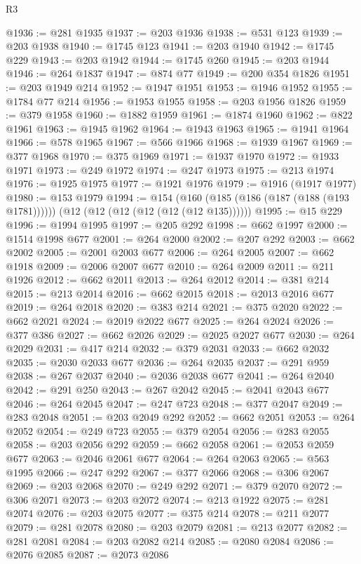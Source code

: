 \begin{lexlean}{R3}
\begin{coremodule}
@1936 := @281 @1935
@1937 := @203 @1936
@1938 := @531 @123
@1939 := @203 @1938
@1940 := @1745 @123
@1941 := @203 @1940
@1942 := @1745 @229
@1943 := @203 @1942
@1944 := @1745 @260
@1945 := @203 @1944
@1946 := @264 @1837
@1947 := @874 @77
@1949 := @200 @354 @1826
@1951 := @203 @1949 @214
@1952 := @1947 @1951
@1953 := @1946 @1952
@1955 := @1784 @77 @214
@1956 := @1953 @1955
@1958 := @203 @1956 @1826
@1959 := @379 @1958
@1960 := @1882 @1959
@1961 := @1874 @1960
@1962 := @822 @1961
@1963 := @1945 @1962
@1964 := @1943 @1963
@1965 := @1941 @1964
@1966 := @578 @1965
@1967 := @566 @1966
@1968 := @1939 @1967
@1969 := @377 @1968
@1970 := @375 @1969
@1971 := @1937 @1970
@1972 := @1933 @1971
@1973 := @249 @1972
@1974 := @247 @1973
@1975 := @213 @1974
@1976 := @1925 @1975
@1977 := @1921 @1976
@1979 := @1916 (@1917 @1977)
@1980 := @153 @1979
@1994 := @154
    (@160 (@185 (@186 (@187 (@188 (@193 @1781))))))
    (@12 (@12 (@12 (@12 (@12 (@12 @135))))))
@1995 := @15 @229
@1996 := @1994 @1995
@1997 := @205 @292
@1998 := @662 @1997
@2000 := @1514 @1998 @677
@2001 := @264 @2000
@2002 := @207 @292
@2003 := @662 @2002
@2005 := @2001 @2003 @677
@2006 := @264 @2005
@2007 := @662 @1918
@2009 := @2006 @2007 @677
@2010 := @264 @2009
@2011 := @211 @1926
@2012 := @662 @2011
@2013 := @264 @2012
@2014 := @381 @214
@2015 := @213 @2014
@2016 := @662 @2015
@2018 := @2013 @2016 @677
@2019 := @264 @2018
@2020 := @383 @214
@2021 := @375 @2020
@2022 := @662 @2021
@2024 := @2019 @2022 @677
@2025 := @264 @2024
@2026 := @377 @386
@2027 := @662 @2026
@2029 := @2025 @2027 @677
@2030 := @264 @2029
@2031 := @417 @214
@2032 := @379 @2031
@2033 := @662 @2032
@2035 := @2030 @2033 @677
@2036 := @264 @2035
@2037 := @291 @959
@2038 := @267 @2037
@2040 := @2036 @2038 @677
@2041 := @264 @2040
@2042 := @291 @250
@2043 := @267 @2042
@2045 := @2041 @2043 @677
@2046 := @264 @2045
@2047 := @247 @723
@2048 := @377 @2047
@2049 := @283 @2048
@2051 := @203 @2049 @292
@2052 := @662 @2051
@2053 := @264 @2052
@2054 := @249 @723
@2055 := @379 @2054
@2056 := @283 @2055
@2058 := @203 @2056 @292
@2059 := @662 @2058
@2061 := @2053 @2059 @677
@2063 := @2046 @2061 @677
@2064 := @264 @2063
@2065 := @563 @1995
@2066 := @247 @292
@2067 := @377 @2066
@2068 := @306 @2067
@2069 := @203 @2068
@2070 := @249 @292
@2071 := @379 @2070
@2072 := @306 @2071
@2073 := @203 @2072
@2074 := @213 @1922
@2075 := @281 @2074
@2076 := @203 @2075
@2077 := @375 @214
@2078 := @211 @2077
@2079 := @281 @2078
@2080 := @203 @2079
@2081 := @213 @2077
@2082 := @281 @2081
@2084 := @203 @2082 @214
@2085 := @2080 @2084
@2086 := @2076 @2085
@2087 := @2073 @2086

\end{coremodule}
\end{lexlean}
